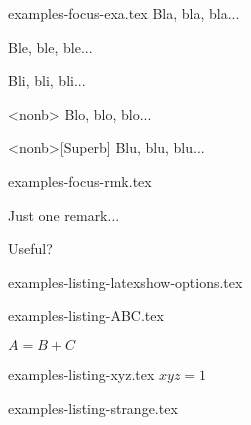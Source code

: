 \begin{filecontents*}[overwrite]{examples-focus-exa.tex}
Bla, bla, bla...

\begin{tdocexa}
    Ble, ble, ble...
\end{tdocexa}

\begin{tdocexa}[Wonderful]
    Bli, bli, bli...
\end{tdocexa}

\begin{tdocexa}<nonb>
    Blo, blo, blo...
\end{tdocexa}

\begin{tdocexa}<nonb>[Superb]
    Blu, blu, blu...
\end{tdocexa}
\end{filecontents*}


\begin{filecontents*}[overwrite]{examples-focus-rmk.tex}
\begin{tdocrem}
    Just one remark...
\end{tdocrem}

\begin{tdocrem}
    Useful?
\end{tdocrem}
\end{filecontents*}


\begin{filecontents*}[overwrite]{examples-listing-latexshow-options.tex}
\end{filecontents*}


\begin{filecontents*}[overwrite]{examples-listing-ABC.tex}
\begin{tdoclatex}[sbs]
    $A = B + C$
\end{tdoclatex}
\end{filecontents*}


\begin{filecontents*}[overwrite]{examples-listing-xyz.tex}
$x y z = 1$
\end{filecontents*}


\begin{filecontents*}[overwrite]{examples-listing-strange.tex}
\begin{tdoclatex}
\end{tdoclatex}
\end{filecontents*}



